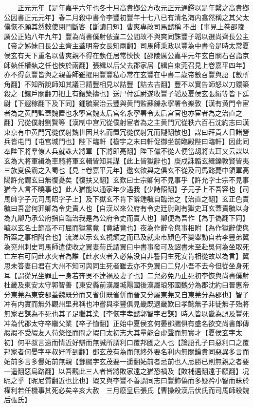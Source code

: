 　　正元元年【是年嘉平六年也冬十月高貴鄉公方改元正元通鑑以是年繫之高貴鄉公因書正元元年】春二月殺中書令李豐初豐年十七八已有清名海内翕然稱之其父太僕恢不願其然敕使閉門斷客【斷讀曰短】曹爽專政司馬懿稱不出【事見上卷邵陵厲公正始八年九年】豐為尚書僕射依違二公間故不與爽同誅豐子韜以選尚齊長公主【帝之姊妹曰長公主齊主蓋明帝女長知兩翻】司馬師秉政以豐為中書令是時太常夏侯玄有天下重名以曹爽親不得在埶任居常怏怏【邵陵厲公嘉平元年玄自關右召詣京師埶任權埶之任也怏於兩翻】張緝以后父去郡家居【緝自東莞召見上卷嘉平四年】亦不得意豐皆與之親善師雖擢用豐豐私心常在玄豐在中書二歲帝數召豐與語【數所角翻】不知所說師知其議已請豐相見以詰豐【詰去吉翻】豐不以實告師怒以刀鐶築殺之【鐶戶關翻刀把上有鐶築擣也】送尸付廷尉遂收豐子韜及夏侯玄張緝等皆下廷尉【下遐稼翻下及下同】鍾毓案治云豐與黄門監蘇鑠永寧署令樂敦【漢有黄門令宦者為之黄門監蓋魏置也永寧宫魏太后宫名永寧署令太后宫官也亦宦者為之治直之翻】冗從僕射劉賢等【漢制中宫冗從僕射宦者為之主黄門冗從秩六百石沈約志曰漢東京有中黄門冗從僕射魏世因其名而置冗從僕射冗而隴翻散也】謀曰拜貴人日諸營兵皆屯門【屯宫城門也】陛下臨軒【檐宇之末曰軒促御坐前臨殿陛曰臨軒】因此同奉陛下將羣僚人兵就誅大將軍【下將即亮翻】陛下儻不從人便當刼將去耳又云謀以玄為大將軍緝為車騎將軍玄輯皆知其謀【此上皆獄辭也】庚戍誅韜玄緝鑠敦賢皆夷三族夏侯霸之入蜀也【見上卷嘉平元年】邀玄欲與之俱玄不從及司馬懿薨中領軍高陽許允謂玄曰無復憂矣【復扶又翻】玄歎曰士宗卿何不見事乎【許允字士宗不見事猶今人言不曉事也】此人猶能以通家年少遇我【少詩照翻】子元子上不吾容也【司馬師字子元司馬昭字子上】及下獄玄不肯下辭鍾毓自臨治之【治直之翻】玄正色責毓曰吾當何罪卿為令史責人也【自漢以來公府有令史廷尉則有獄史耳玄蓋責毓以身為九卿乃承公府指自臨治我是為公府令史而責人也】卿便為吾作【為于偽翻下同】毓以玄名士節高不可屈而獄當竟【竟結竟也】夜為作辭令與事相附【為作獄辭使與所案之事相附合也】流涕以示玄玄視頷之而已及就東市顔色不變舉動自若李豐弟翼為兖州刺史司馬師遣使收之翼妻荀氏謂翼曰中書事發可及詔書未至赴吳何為坐取死亡左右可同赴水火者為誰【赴水火者入必焦没自非誓同生死安肯相從故以為言】翼思未答妻曰君在大州不知可與同生死者雖去亦不免翼曰二兒小吾不去今但從坐身死耳【謂從兄坐罪止一身若奔吳不逹禍及妻子也】二兒必免乃止死初李恢與尚書僕射杜畿及東安太守郭智善【東安縣前漢屬城陽國後漢屬琅邪國魏分為郡沈約曰晉惠帝分東莞為東安郡蓋魏既分而又省併既省併而晉又分屬東莞又自東莞分為郡也】智子冲有内實而無外觀州里弗稱也冲嘗與李豐俱見畿既退畿歎曰孝懿無子非徒無子殆將無家君謀為不死也其子足繼其業【李恢字孝懿郭智字君謀】時人皆以畿為誤及豐死冲為代郡太守卒繼父業【卒子恤翻】正始中夏侯玄何晏鄧颺俱有盛名欲交尚書郎傳嘏嘏不受嘏友人荀粲怪而問之嘏曰太初志大其量能合虚聲而無實才【夏侯玄字太初】何平叔言遠而情近好辯而無誠所謂利口覆邦國之人也【論語孔子曰惡利口之覆邦家者何晏字平叔好呼到翻】鄧玄茂有為而無終外要名利内無關鑰貴同惡異多言而妬前多言多釁妬前無親【鄧颺字玄茂要一遥翻妬前者忌前也人忌勝已則無親之者要一遥翻惡烏路翻】以吾觀此三人者皆將敗家遠之猶恐禍及【敗補邁翻遠于願翻】况昵之乎【昵尼質翻近也比也】嘏又與李豐不善謂同志曰豐飾偽而多疑矜小智而昧於權利若任機事其死必矣辛亥大赦　三月廢皇后張氏【曹操殺漢后伏氏而司馬師殺魏后張氏】

